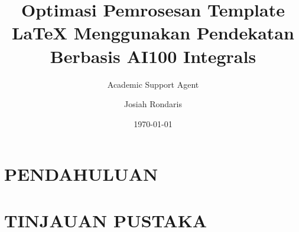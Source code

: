 \documentclass{article}
\title{Optimasi Pemrosesan Template LaTeX Menggunakan Pendekatan Berbasis AI}
\author{Academic Support Agent}
\date{\today}
\begin{document}
\maketitle

\begin{abstract}

\end{abstract}

\chapter{PENDAHULUAN}


\chapter{TINJAUAN PUSTAKA}


\usepackage[utf8]{inputenc}
\usepackage{amssymb}
\usepackage{amsfonts}
\usepackage{amsmath}
\usepackage{bigints}
\DeclareMathOperator{\arcsec}{arcsec}
\DeclareMathOperator{\arccot}{arccot}
\DeclareMathOperator{\arccsc}{arccsc}
\addtolength{\jot}{0.75em}
\title{100 Integrals}
\author{Josiah Rondaris}
\end{document}
